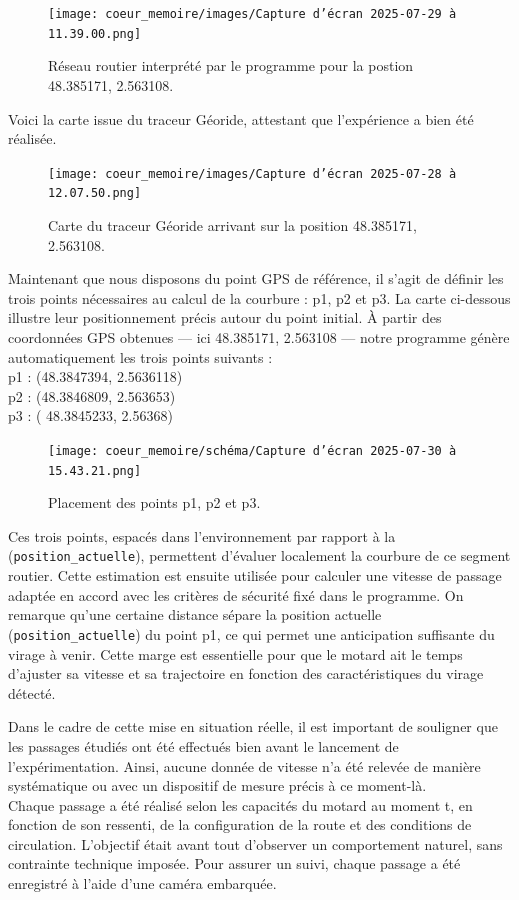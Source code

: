 \begin{figure}[H]
    \centering
    \texttt{[image: coeur\_memoire/images/Capture d’écran 2025-07-29 à 11.39.00.png]} 
    \caption{Réseau routier interprété par le programme pour la postion 48.385171, 2.563108.}
\end{figure}
Voici la carte issue du traceur Géoride, attestant que l’expérience a bien été réalisée.
\begin{figure}[H]
    \centering
    \texttt{[image: coeur\_memoire/images/Capture d’écran 2025-07-28 à 12.07.50.png]} 
    \caption{Carte du traceur Géoride arrivant sur la position 48.385171, 2.563108.}
\end{figure}
Maintenant que nous disposons du point GPS de référence, il s'agit de définir les trois points nécessaires au calcul de la courbure : p1, p2 et p3. La carte ci-dessous illustre leur positionnement précis autour du point initial.
À partir des coordonnées GPS obtenues — ici 48.385171, 2.563108 — notre programme génère automatiquement les trois points suivants :\\
p1 : (48.3847394, 2.5636118)\\
p2 : (48.3846809, 2.563653)\\
p3 : ( 48.3845233, 2.56368)\\

\begin{figure}[H]
    \centering
    \texttt{[image: coeur\_memoire/schéma/Capture d’écran 2025-07-30 à 15.43.21.png]} 
    \caption{Placement des points p1, p2 et p3.}
    \label{fig:cartepoints}
\end{figure}
Ces trois points, espacés dans l’environnement par rapport à la (\texttt{position\_actuelle}), permettent d’évaluer localement la courbure de ce segment routier. Cette estimation est ensuite utilisée pour calculer une vitesse de passage adaptée en accord avec les critères de sécurité fixé dans le programme.
On remarque qu'une certaine distance sépare la position actuelle (\texttt{position\_actuelle}) du point p1, ce qui permet une anticipation suffisante du virage à venir. Cette marge est essentielle pour que le motard ait le temps d'ajuster sa vitesse et sa trajectoire en fonction des caractéristiques du virage détecté.

\vspace{0.5cm}
Dans le cadre de cette mise en situation réelle, il est important de souligner que les passages étudiés ont été effectués bien avant le lancement de l’expérimentation. Ainsi, aucune donnée de vitesse n’a été relevée de manière systématique ou avec un dispositif de mesure précis à ce moment-là.\\
Chaque passage a été réalisé selon les capacités du motard au moment t, en fonction de son ressenti, de la configuration de la route et des conditions de circulation. L’objectif était avant tout d’observer un comportement naturel, sans contrainte technique imposée. Pour assurer un suivi, chaque passage a été enregistré à l’aide d’une caméra embarquée.

